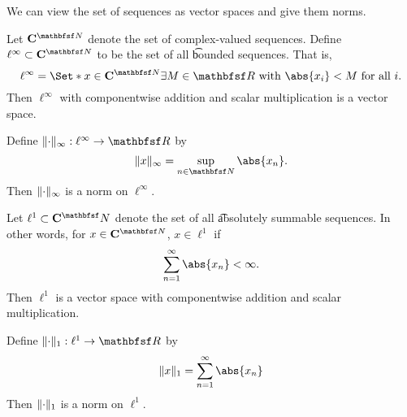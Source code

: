 

We can view the set of sequences as vector spaces and give them norms.


Let $\C^{\N}$ denote the set of complex-valued sequences.
Define $\ell^{\infty} \subset \C^{\N}$ to be the set of all \t{bounded sequences}.
That is, \[ \ell^{\infty} = \Set*{x \in \C^{\N}}{\exists M \in \R \text{ with } \abs{x_i} < M \text{ for all } i}.\]
Then $\ell^{\infty}$ with componentwise addition and scalar multiplication is a vector space.

\begin{exercise}
Define $\norm{\cdot}_{\infty}: \ell^{\infty} \to \R$ by
\[
  \norm{x}_{\infty} = \sup_{n \in \N} \abs{x_n}.
\]
Then $\lVert\cdot\rVert_{\infty}$ is a norm on $\ell^\infty$.
\end{exercise}


Let $\ell^1 \subset \C^\N$ denote the set of all \t{absolutely summable sequences}. In other words, for $x \in \C^{\N}$, $x \in \ell^1$ if
\[
  \sum_{n = 1}^{\infty} \abs{x_n} < \infty.
\]
Then $\ell^1$ is a vector space with componentwise addition and scalar multiplication.

\begin{exercise}
Define $\norm{\cdot}_{1}: \ell^{1} \to \R$ by
\[
  \norm{x}_{1} = \sum_{n = 1}^{\infty} \abs{x_n}
\]
Then $\lVert\cdot\rVert_{1}$ is a norm on $\ell^1$.
\end{exercise}
